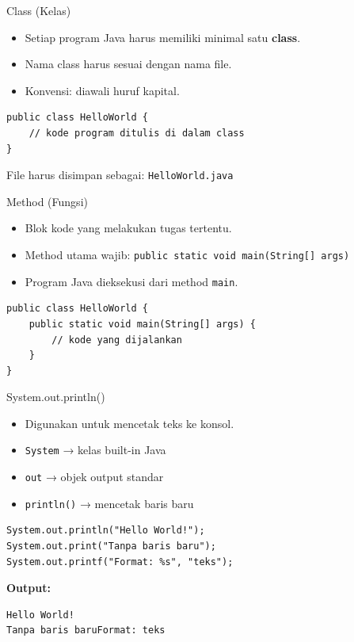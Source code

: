 \documentclass{beamer}
\begin{document}
\begin{frame}[fragile]{Class (Kelas)}
  \begin{itemize}
    \item Setiap program Java harus memiliki minimal satu \textbf{class}.
    \item Nama class harus sesuai dengan nama file.
    \item Konvensi: diawali huruf kapital.
  \end{itemize}
\begin{lstlisting}
public class HelloWorld {
    // kode program ditulis di dalam class
}
\end{lstlisting}
  \small File harus disimpan sebagai: \texttt{HelloWorld.java}
\end{frame}

\begin{frame}[fragile]{Method (Fungsi)}
  \begin{itemize}
    \item Blok kode yang melakukan tugas tertentu.
    \item Method utama wajib: \texttt{public static void main(String[] args)}
    \item Program Java dieksekusi dari method \texttt{main}.
  \end{itemize}
\begin{lstlisting}
public class HelloWorld {
    public static void main(String[] args) {
        // kode yang dijalankan
    }
}
\end{lstlisting}
\end{frame}

\begin{frame}[fragile]{System.out.println()}
  \begin{itemize}
    \item Digunakan untuk mencetak teks ke konsol.
    \item \texttt{System} → kelas built-in Java
    \item \texttt{out} → objek output standar
    \item \texttt{println()} → mencetak baris baru
  \end{itemize}
\begin{lstlisting}
System.out.println("Hello World!");
System.out.print("Tanpa baris baru");
System.out.printf("Format: %s", "teks");
\end{lstlisting}
  \textbf{Output:}
\begin{lstlisting}
Hello World!
Tanpa baris baruFormat: teks
\end{lstlisting}
\end{frame}
\end{document}
